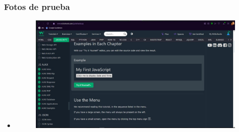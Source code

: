 \documentclass{article}
\begin{document}
	\subsubsection{Fotos de prueba}
	\begin{itemize}
		\item \begin{figure}[H]
			\centering
			\includegraphics[width=1.0\textwidth,keepaspectratio]{img/wsLuis.jpg}
		\end{figure}


\end{itemize}
\end{document}
